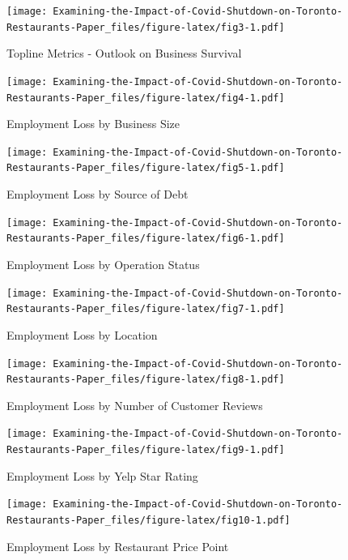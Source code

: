 \documentclass[
]{article}
\begin{document}
\begin{figure}
\centering
\texttt{[image: Examining-the-Impact-of-Covid-Shutdown-on-Toronto-Restaurants-Paper\_files/figure-latex/fig3-1.pdf]}
\caption{\label{fig:fig3}Topline Metrics - Outlook on Business Survival}
\end{figure}

\begin{figure}
\centering
\texttt{[image: Examining-the-Impact-of-Covid-Shutdown-on-Toronto-Restaurants-Paper\_files/figure-latex/fig4-1.pdf]}
\caption{\label{fig:fig4}Employment Loss by Business Size}
\end{figure}

\begin{figure}
\centering
\texttt{[image: Examining-the-Impact-of-Covid-Shutdown-on-Toronto-Restaurants-Paper\_files/figure-latex/fig5-1.pdf]}
\caption{\label{fig:fig5}Employment Loss by Source of Debt}
\end{figure}

\begin{figure}
\centering
\texttt{[image: Examining-the-Impact-of-Covid-Shutdown-on-Toronto-Restaurants-Paper\_files/figure-latex/fig6-1.pdf]}
\caption{\label{fig:fig6}Employment Loss by Operation Status}
\end{figure}

\begin{figure}
\centering
\texttt{[image: Examining-the-Impact-of-Covid-Shutdown-on-Toronto-Restaurants-Paper\_files/figure-latex/fig7-1.pdf]}
\caption{\label{fig:fig7}Employment Loss by Location}
\end{figure}

\begin{figure}
\centering
\texttt{[image: Examining-the-Impact-of-Covid-Shutdown-on-Toronto-Restaurants-Paper\_files/figure-latex/fig8-1.pdf]}
\caption{\label{fig:fig8}Employment Loss by Number of Customer Reviews}
\end{figure}

\begin{figure}
\centering
\texttt{[image: Examining-the-Impact-of-Covid-Shutdown-on-Toronto-Restaurants-Paper\_files/figure-latex/fig9-1.pdf]}
\caption{\label{fig:fig9}Employment Loss by Yelp Star Rating}
\end{figure}

\begin{figure}
\centering
\texttt{[image: Examining-the-Impact-of-Covid-Shutdown-on-Toronto-Restaurants-Paper\_files/figure-latex/fig10-1.pdf]}
\caption{\label{fig:fig10}Employment Loss by Restaurant Price Point}
\end{figure}
\end{document}

